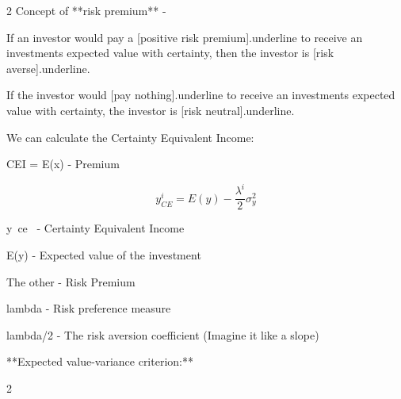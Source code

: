 \documentclass{article}
\begin{document}
\begin{multicols}{2}
Concept of **risk premium** -

If an investor would pay a [positive risk premium]{.underline} to receive an investments expected value with certainty, then the investor is [risk averse]{.underline}.

If the investor would [pay nothing]{.underline} to receive an investments expected value with certainty, the investor is [risk neutral]{.underline}.



We can calculate the Certainty Equivalent Income:

CEI = E(x) - Premium

$$
y_{C E}^i=E(y)-\frac{\lambda^i}{2} \sigma_y^2
$$

y~ce~ - Certainty Equivalent Income

E(y) - Expected value of the investment

The other - Risk Premium

lambda - Risk preference measure

lambda/2 - The risk aversion coefficient (Imagine it like a slope)

**Expected value-variance criterion:**

\end{multicols}{2}  
\end{document}

